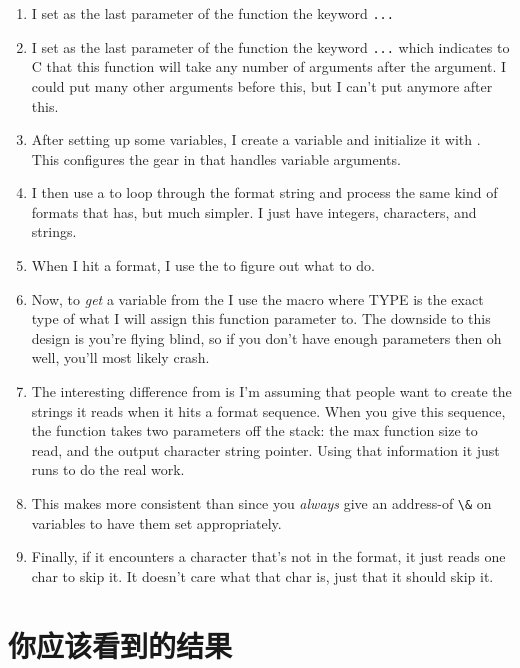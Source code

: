 \begin{enumerate}
\item I set as the last parameter of the function the keyword \verb|...|
\item I set as the last parameter of the function the keyword \verb|...|
    which indicates to C that this function will take any number of arguments
    after the  argument.  I could put many other arguments before
    this, but I can't put anymore after this.
\item After setting up some variables, I create a  variable
    and initialize it with .  This configures the gear
    in  that handles variable arguments.
\item I then use a  to loop through the format string
     and process the same kind of formats that 
    has, but much simpler.  I just have integers, characters, and strings.
\item When I hit a format, I use the  to figure out
    what to do.
\item Now, to \emph{get} a variable from the  I use the
    macro  where TYPE is the exact type of what
    I will assign this function parameter to.  The downside to this design
    is you're flying blind, so if you don't have enough parameters then
    oh well, you'll most likely crash.
\item The interesting difference from  is I'm assuming that people
    want  to create the strings it reads when it hits a
     format sequence.  When you give this sequence, the function
    takes two parameters off the  stack: the max function
    size to read, and the output character string pointer.  Using that information
    it just runs  to do the real work.
\item This makes  more consistent than  since you
    \emph{always} give an address-of \verb|\&| on variables to have them set
    appropriately.
\item Finally, if it encounters a character that's not in the format, it just reads
    one char to skip it.  It doesn't care what that char is, just that it should
    skip it.
\end{enumerate}


\section{你应该看到的结果}

